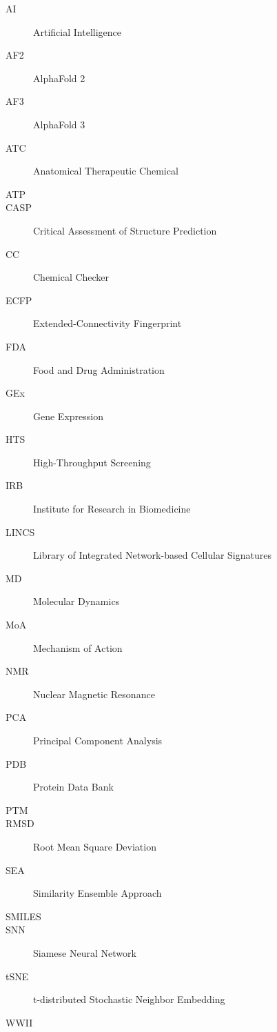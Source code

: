 

\begin{description}
    \item[AI] Artificial Intelligence
    \item[AF2] AlphaFold 2
    \item[AF3] AlphaFold 3
    \item[ATC] Anatomical Therapeutic Chemical
    \item[ATP]
    \item[CASP] Critical Assessment of Structure Prediction 
    \item[CC] Chemical Checker
    \item[ECFP] Extended-Connectivity Fingerprint
    \item[FDA] Food and Drug Administration
    \item[GEx] Gene Expression
    \item[HTS] High-Throughput Screening
    \item[IRB] Institute for Research in Biomedicine 
    \item[LINCS] Library of Integrated Network-based Cellular Signatures
    \item[MD] Molecular Dynamics
    \item[MoA] Mechanism of Action
    \item[NMR] Nuclear Magnetic Resonance
    \item[PCA] Principal Component Analysis
    \item[PDB] Protein Data Bank
    \item[PTM] 
    \item[RMSD] Root Mean Square Deviation
    \item[SEA] Similarity Ensemble Approach
    \item[SMILES] 
    \item[SNN] Siamese Neural Network
    \item[tSNE] t-distributed Stochastic Neighbor Embedding
    \item[WWII] 
\end{description}

